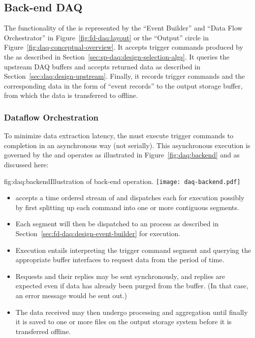 \subsection{Back-end DAQ}
\label{sec:fd-daq:design-backend}

The functionality of the  is represented by the ``Event Builder'' and ``Data Flow Orchestrator'' in Figure~\ref{fig:fd-daq:layout} or the ``Output'' circle in Figure~\ref{fig:daq-conceptual-overview}. 
It accepts trigger commands produced by the  as described in Section~\ref{sec:sp-daq:design-selection-algs}. 
It queries the upstream DAQ buffers and accepts returned data as described in Section~\ref{sec:daq:design-upstream}. 
Finally, it records trigger commands and the corresponding data in the
form of ``event records'' to the output storage buffer, from which the data is transferred to offline.

\subsubsection{Dataflow Orchestration}

To minimize data extraction latency, the  must execute
trigger commands to completion in an asynchronous way (not serially). 
This asynchronous execution is governed by the  and operates as illustrated in Figure~\ref{fig:daq:backend} and as discussed here:

\begin{dunefigure}{fig:daq:backend}{Illustration of   back-end operation.}
  \texttt{[image: daq-backend.pdf]}
\end{dunefigure}

\begin{itemize}
\item {} accepts a time ordered stream of  and dispatches each for execution possibly by first splitting up each command into one or more contiguous segments.
\item Each segment will then be dispatched to an  process as described in Section~\ref{sec:fd-daq:design-event-builder} for execution.
\item Execution entails interpreting the trigger command segment and querying the appropriate  buffer interfaces to request data from the period of time. 
\item Requests and their replies may be sent synchronously, and
  replies are expected even if data has already been purged from the
   buffer. (In that case, an error message would be sent out.)
\item The data received may then undergo processing and aggregation
  until finally it is saved to one or more files on the output storage
  system before it is transferred offline.
\end{itemize}



